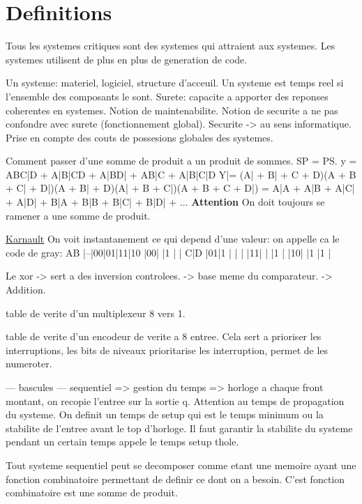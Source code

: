 
\section{Definitions} %
\label{sec:Definitions}
    Tous les systemes critiques sont des systemes qui attraient aux systemes.
    Les systemes utilisent de plus en plus de generation de code.

    Un systeme: materiel, logiciel, structure d'acceuil. Un systeme est temps
    reel si l'ensemble des composants le sont.
    Surete: capacite a apporter des reponses coherentes en systemes.
    Notion de maintenabilite.
    Notion de securite a ne pas confondre avec surete (fonctionnement global).
    Securite -> au sens informatique.
    Prise en compte des couts de possesions globales des systemes.

    Comment passer d'une somme de produit a un produit de sommes.
    SP = PS.
    y = ABC|D + A|B|CD + A|BD| + AB|C + A|B|C|D
    Y|= (A| + B| + C + D)(A + B + C| + D|)(A + B| + D)(A| + B + C|)(A + B + C
    + D|)
    = A|A + A|B + A|C| + A|D| + B|A + B|B + B|C| + B|D| + ...
    \textbf{Attention} On doit toujours se ramener a une somme de produit.

    \underline{Karnault}
	On voit instantanement ce qui depend d'une valeur:
	on appelle ca le code de gray:
		AB
	|--|00|01|11|10
	|00|  |1 |  |
    C|D |01|1 |  |  |
	|11|  |  |1 |
	|10|  |1 |1 |

    Le xor  -> sert a des inversion controlees.
	    -> base meme du comparateur.
	    -> Addition.


    table de verite d'un multiplexeur 8 vers 1.

    table de verite d'un encodeur de verite a 8 entree.
    Cela sert a prioriser les interruptions, les bits de niveaux prioritarise
    les interruption, permet de les numeroter.

    --- bascules ---
    sequentiel => gestion du temps => horloge
    a chaque front montant, on recopie l'entree sur la sortie q.
    Attention au temps de propagation du systeme.
    On definit un temps de setup qui est le temps minimum ou la
    stabilite de l'entree avant le top d'horloge.
    Il faut garantir la stabilite du systeme pendant un certain temps appele
    le temps setup thole.

    Tout systeme sequentiel peut se decomposer comme etant une memoire ayant
    une fonction combinatoire permettant de definir ce dont on a besoin. C'est
    fonction combinatoire est une somme de produit.

